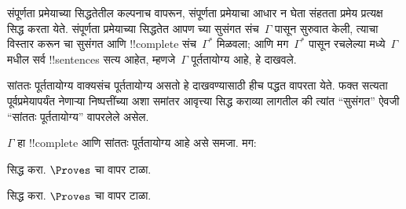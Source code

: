\documentclass[../../../include/open-logic-section]{subfiles}
\begin{document}
      {}
      {}


संपूर्णता प्रमेयाच्या सिद्धतेतील कल्पनाच वापरून, संपूर्णता प्रमेयाचा आधार
न घेता संहतता प्रमेय प्रत्यक्ष सिद्ध करता येते. संपूर्णता प्रमेयाच्या
सिद्धतेत आपण च्या सुसंगत संच~$\Gamma$ पासून सुरुवात केली,
त्याचा विस्तार करून चा सुसंगत आणि
!!{complete} संच~$\Gamma^*$ मिळवला; आणि मग~$\Gamma^*$ पासून रचलेल्या
मध्ये~$\Gamma$ मधील सर्व !!{sentence}s सत्य आहेत, म्हणजे~$\Gamma$
पूर्ततायोग्य आहे, हे दाखवले.

सांततः पूर्ततायोग्य वाक्यसंच पूर्ततायोग्य असतो हे दाखवण्यासाठी हीच पद्धत
वापरता येते. फक्त सत्यता पूर्वप्रमेयापर्यंत नेणाऱ्या निष्पत्तींच्या अशा
समांतर आवृत्त्या सिद्ध कराव्या लागतील की त्यांत ``सुसंगत'' ऐवजी ``सांततः
पूर्ततायोग्य'' वापरलेले असेल.

\begin{prop}
$\Gamma$ हा !!{complete} आणि सांततः पूर्ततायोग्य आहे असे समजा. मग:
\begin{enumerate}


\end{enumerate}
\end{prop}

\begin{prob}
 सिद्ध करा. $\Proves$ चा वापर टाळा.
\end{prob}
\tagendprob

\begin{prob}
 सिद्ध करा. $\Proves$ चा वापर टाळा.
\end{prob}
\tagendprob

\end{document}
